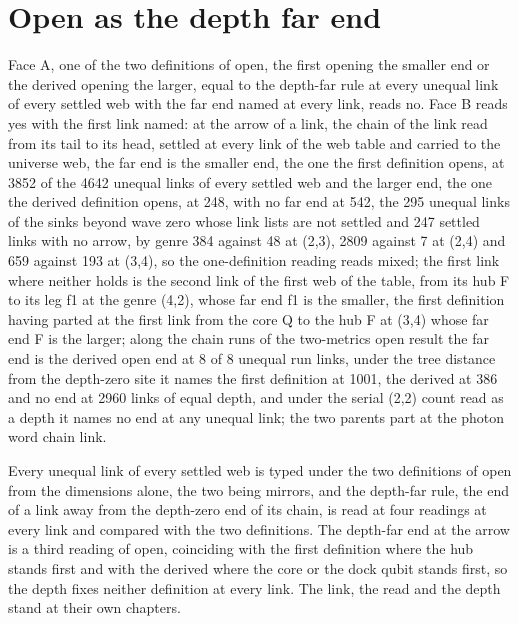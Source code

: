 \section{Open as the depth far end}\label{mod:X-4-D543900-w-opdf}
\begin{chwall}\label{box:X-4-D543900-w-opdf:1}
Face A, one of the two definitions of open, the first opening the smaller end or the derived opening the larger, equal to the depth-far rule at every unequal link of every settled web with the far end named at every link, reads no. Face B reads yes with the first link named: at the arrow of a link, the chain of the link read from its tail to its head, settled at every link of the web table and carried to the universe web, the far end is the smaller end, the one the first definition opens, at 3852 of the 4642 unequal links of every settled web and the larger end, the one the derived definition opens, at 248, with no far end at 542, the 295 unequal links of the sinks beyond wave zero whose link lists are not settled and 247 settled links with no arrow, by genre 384 against 48 at (2,3), 2809 against 7 at (2,4) and 659 against 193 at (3,4), so the one-definition reading reads mixed; the first link where neither holds is the second link of the first web of the table, from its hub F to its leg f1 at the genre (4,2), whose far end f1 is the smaller, the first definition having parted at the first link from the core Q to the hub F at (3,4) whose far end F is the larger; along the chain runs of the two-metrics open result the far end is the derived open end at 8 of 8 unequal run links, under the tree distance from the depth-zero site it names the first definition at 1001, the derived at 386 and no end at 2960 links of equal depth, and under the serial (2,2) count read as a depth it names no end at any unequal link; the two parents part at the photon word chain link.
\end{chwall}
Every unequal link of every settled web is typed under the two definitions of open from the dimensions alone, the two being mirrors, and the depth-far rule, the end of a link away from the depth-zero end of its chain, is read at four readings at every link and compared with the two definitions. The depth-far end at the arrow is a third reading of open, coinciding with the first definition where the hub stands first and with the derived where the core or the dock qubit stands first, so the depth fixes neither definition at every link. The link, the read and the depth stand at their own chapters.
